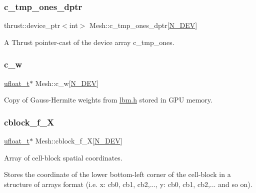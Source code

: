 \subsubsection{\texorpdfstring{c\+\_\+tmp\+\_\+ones\+\_\+dptr}{c\_tmp\_ones\_dptr}}
{\footnotesize\ttfamily thrust\+::device\+\_\+ptr$<$int$>$ Mesh\+::c\+\_\+tmp\+\_\+ones\+\_\+dptr\mbox{[}\hyperlink{cppspec_8h_a2b674dab7a14f1bf32b48b7fda5022dc}{N\+\_\+\+D\+EV}\mbox{]}\hspace{0.3cm}{\ttfamily [private]}}



A Thrust pointer-\/cast of the device array c\+\_\+tmp\+\_\+ones. 

\mbox{\label{classMesh_addc2191bde89ef706353fdea9328fd1f}} 
\subsubsection{\texorpdfstring{c\+\_\+w}{c\_w}}
{\footnotesize\ttfamily \hyperlink{cppspec_8h_af529d360dfac9b9578aa719418a53a21}{ufloat\+\_\+t}$\ast$ Mesh\+::c\+\_\+w\mbox{[}\hyperlink{cppspec_8h_a2b674dab7a14f1bf32b48b7fda5022dc}{N\+\_\+\+D\+EV}\mbox{]}}



Copy of Gauss-\/\+Hermite weights from \hyperlink{lbm_8h}{lbm.\+h} stored in G\+PU memory. 

\mbox{\label{classMesh_a6f0e622a1e6706f4c7ef3b86474fd654}} 
\subsubsection{\texorpdfstring{cblock\+\_\+f\+\_\+X}{cblock\_f\_X}}
{\footnotesize\ttfamily \hyperlink{cppspec_8h_af529d360dfac9b9578aa719418a53a21}{ufloat\+\_\+t}$\ast$ Mesh\+::cblock\+\_\+f\+\_\+X\mbox{[}\hyperlink{cppspec_8h_a2b674dab7a14f1bf32b48b7fda5022dc}{N\+\_\+\+D\+EV}\mbox{]}}



Array of cell-\/block spatial coordinates. 

Stores the coordinate of the lower bottom-\/left corner of the cell-\/block in a structure of arrays format (i.\+e. x\+: cb0, cb1, cb2,..., y\+: cb0, cb1, cb2,... and so on). \mbox{\label{classMesh_ac9cda8833eb008b6a99988e18fd09960}} 
